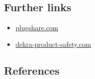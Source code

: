 \documentclass[
]{book}
\providecommand{\tightlist}{%
  \setlength{\itemsep}{0pt}\setlength{\parskip}{0pt}}
\begin{document}
\hypertarget{further-links-6}{%
\subsection*{Further links}\label{further-links-6}}

\begin{itemize}
\tightlist
\item
  \href{https://www.plugshare.com/en}{plugshare.com}
\item
  \href{https://www.dekra-product-safety.com/en/ev-charging-station-technology}{dekra-product-safety.com}
\end{itemize}

\hypertarget{references-7}{%
\subsection*{References}\label{references-7}}
\end{document}
